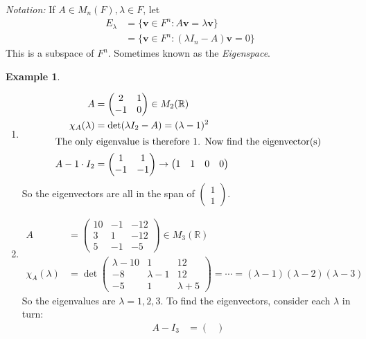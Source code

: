 \documentclass{report}
\theoremstyle{remark}
\theoremstyle{definition}
\theoremstyle{definition}
\newtheorem{example}[theorem]{Example}
\theoremstyle{theorem}
\renewcommand{\v}[1]{\mathbf{#1}}
\providecommand{\vectii}[2]{\begin{pmatrix}#1\\#2\end{pmatrix}}
\begin{document}
\emph{Notation:} If $A \in M_n(F), \lambda \in F$, let
\begin{align*}
    E_\lambda&= \{ \v{v} \in F^n: A\v{v}=\lambda\v{v}\}\\
    &=\{\v{v} \in F^n: (\lambda I_n - A)\v{v}=0\}
\end{align*}
This is a subspace of $F^n$. Sometimes known as the \emph{Eigenspace}.
\begin{example} 
\begin{enumerate}[label=(\arabic*)]
    \item \begin{align*}
        A &= \begin{pmatrix}
        2&1\\
        -1&0
        \end{pmatrix} \in M_2(\mathbb{R})\\
        \chi_A(\lambda) &= \det(\lambda I_2- A)=(\lambda-1)^2\\
        \intertext{The only eigenvalue is therefore 1. Now find the eigenvector(s)}
        A-1\cdot I_2 &= \begin{pmatrix}
        1&1\\-1&-1
        \end{pmatrix} \rightarrow \begin{pmatrix}
        1&1&0&0
        \end{pmatrix}
    \end{align*}
    So the eigenvectors are all in the span of $\vectii{1}{1}$.
    \item \begin{align*}
        A &= \begin{pmatrix}
        10&-1&-12\\
        3&1&-12\\
        5&-1&-5
        \end{pmatrix} \in M_3(\mathbb{R})\\
        \chi_A(\lambda) &= \det\begin{pmatrix}
        \lambda-10&1&12\\
        -8&\lambda-1&12\\
        -5&1&\lambda+5
        \end{pmatrix} = \cdots = (\lambda-1)(\lambda-2)(\lambda-3)
    \end{align*}
    So the eigenvalues are $\lambda=1,2,3$. To find the eigenvectors, consider each $\lambda$ in turn:
    \begin{align*}
        A-I_3&=\begin{pmatrix}

\end{pmatrix}
\end{align*}
\end{enumerate}
\end{example}
\end{document}
